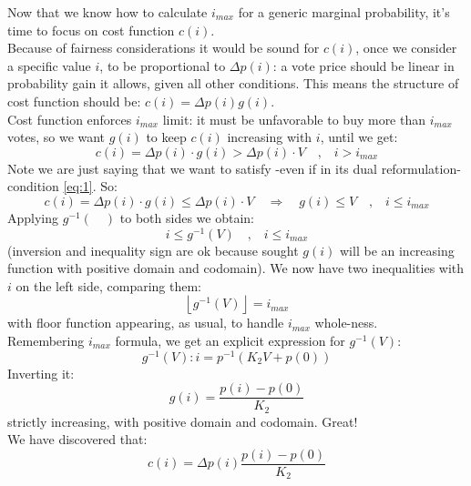 \documentclass[10pt,a4paper]{article}
\begin{document}
	Now that we know how to calculate $i_{max}$ for a generic marginal probability, it’s time to focus on cost function $c(i)$.\\
	Because of fairness considerations it would be sound for $c(i)$, once we consider a specific value $i$, to be proportional to $\Delta p(i)$: a vote price should be linear in probability gain it allows, given all other conditions. This means the structure of cost function should be: $c(i)= \Delta p(i) g(i)$.\\
	Cost function enforces $i_{max}$ limit: it must be unfavorable to buy more than $i_{max}$ votes, so we want $g(i)$ to keep $c(i)$ increasing with $i$, until we get:
	\begin{equation*}
		c(i)=\Delta p(i) \cdot g(i) > \Delta p(i) \cdot V \quad \textrm{,} \quad i > i_{max}
	\end{equation*}
	Note we are just saying that we want to satisfy -even if in its dual reformulation- condition \ref{eq:1}. So:
	\begin{equation*}
		c(i)=\Delta p(i) \cdot g(i) \leq \Delta p(i) \cdot V \quad \Longrightarrow \quad g(i) \leq V \quad \textrm{,} \quad i \leq i_{max}
	\end{equation*}
	Applying $g^{-1}(\quad)$ to both sides we obtain:
	\begin{equation*}
		i \leq g^{-1}(V) \quad \textrm{,} \quad i \leq i_{max}
	\end{equation*}
	(inversion and inequality sign are ok because sought $g(i)$ will be an increasing function with positive domain and codomain). We now have two inequalities with $i$ on the left side, comparing them:
	\begin{equation*}
		\left\lfloor g^{-1}(V) \right\rfloor = i_{max}
	\end{equation*}
	with floor function appearing, as usual, to handle $ i_{max}$ whole-ness.\\ Remembering  $i_{max}$ formula, we get an explicit expression for $g^{-1}(V)$:
	\begin{equation*}
		g^{-1}(V): i = p^{-1}(K_{2}V+p(0))
	\end{equation*}
	Inverting it:
	\begin{equation*}
		g(i)=\frac{p(i)-p(0)}{K_{2}}	
	\end{equation*}	
	strictly increasing, with positive domain and codomain. Great!\\ 
	We have discovered that:
	\begin{equation*}
		c(i)=\Delta p(i) \frac{p(i)-p(0)}{K_{2}}	
	\end{equation*}	
\end{document}
